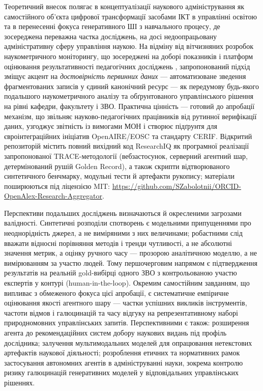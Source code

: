 Теоретичний внесок полягає в концептуалізації наукового адміністрування як самостійного об'єкта цифрової трансформації засобами ІКТ в управлінні освітою та в перенесенні фокуса генеративного ШІ з навчального процесу, де зосереджена переважна частка досліджень, на досі недоопрацьовану адміністративну сферу управління наукою. На відміну від вітчизняних розробок наукометричного моніторингу, що зосереджені на доборі показників і платформ оцінювання результативності педагогічних досліджень \cite{Bykov2021ScientometricIndicators, Bykov2020OpenDigitalSystems}, запропонований підхід зміщує акцент на \textit{достовірність первинних даних} --- автоматизоване зведення фрагментованих записів у єдиний канонічний ресурс --- як передумову будь-якого подальшого наукометричного аналізу та обґрунтованого управлінського рішення на рівні кафедри, факультету і ЗВО. Практична цінність --- готовий до апробації механізм, що звільняє науково-педагогічних працівників від рутинної верифікації даних, узгоджує звітність із вимогами МОН і створює підґрунтя для євроінтеграційних ініціатив OpenAIRE/EOSC та стандарту CERIF. Відкритий репозиторій містить повний вихідний код ResearchIQ як програмної реалізації запропонованої TRACE-методології (вебзастосунок, серверний агентний шар, детермінований рушій Golden Record), а також скрипти відтворюваного синтетичного бенчмарку, модульні тести й артефакти рукопису; матеріали поширюються під ліцензією MIT: \url{https://github.com/SZabolotnii/ORCID-OpenAlex-Research-Aggregator}.

Перспективи подальших досліджень визначаються й окресленими загрозами валідності. Синтетичні розподіли спотворень є модельними припущеннями про неоднорідність джерел, а не виміряними з них величинами; робастними слід вважати відносні порівняння методів і тренди чутливості, а не абсолютні значення метрик, а оцінку ручного часу --- прозорою аналітичною моделлю, а не вимірюванням за участю людей. Тому першочерговим напрямом є підтвердження результатів на реальній gold-вибірці одного ЗВО з контрольованою участю експертів у контурі (human-in-the-loop). Окремим самостійним завданням, що випливає з обмеженого фокуса цієї апробації, є систематичне емпіричне оцінювання якості агентного шару --- частки успішних викликів інструментів, частоти відмов і галюцинацій та часу відгуку на репрезентативному наборі природномовних управлінських запитів. Перспективними є також: розширення агента до рекомендаційних систем добору наукових видань під профіль дослідника; залучення мультимодальних моделей для опрацювання нетекстових артефактів наукової діяльності; розроблення етичних та нормативних рамок застосування автономних агентів в адмініструванні науки, зокрема контролю ризику галюцинацій генеративних моделей у відповідальних управлінських рішеннях.
